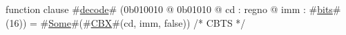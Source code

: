 function clause #\hyperref[zdecode]{decode}# (0b010010 @ 0b01010 @ cd : regno @ imm : #\hyperref[zbits]{bits}#(16)) = #\hyperref[zSome]{Some}#(#\hyperref[zCBX]{CBX}#(cd, imm, false)) /* CBTS */
